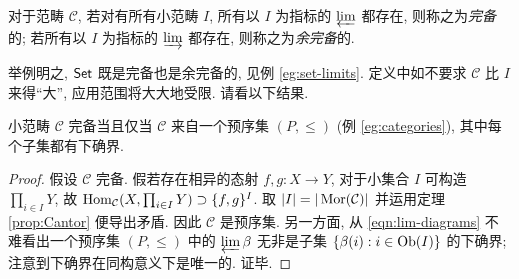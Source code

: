 \begin{definition}\label{def:completeness}
	对于范畴 $\mathcal{C}$, 若对有所有小范畴 $I$, 所有以 $I$ 为指标的 $\varprojlim$ 都存在, 则称之为\emph{完备}的; 若所有以 $I$ 为指标的 $\varinjlim$ 都存在, 则称之为\emph{余完备}的.
\end{definition}
举例明之, $\mathsf{Set}$ 既是完备也是余完备的, 见例 \ref{eg:set-limits}. 定义中如不要求 $\mathcal{C}$ 比 $I$ 来得``大'', 应用范围将大大地受限. 请看以下结果.
\begin{proposition}[P.\ Freyd]\label{prop:preorder-complete}
	小范畴 $\mathcal{C}$ 完备当且仅当 $\mathcal{C}$ 来自一个预序集 $(P, \leq)$ (例 \ref{eg:categories}), 其中每个子集都有下确界.
\end{proposition}
\begin{proof}
	假设 $\mathcal{C}$ 完备. 假若存在相异的态射 $f, g: X \to Y$, 对于小集合 $I$ 可构造 $\prod_{i \in I} Y$, 故 $\operatorname{Hom}_{\mathcal{C}}(X, \prod_{i \in I} Y) \supset \{f, g\}^I$. 取 $|I| = |\operatorname{Mor}(\mathcal{C})|$ 并运用定理 \ref{prop:Cantor} 便导出矛盾. 因此 $\mathcal{C}$ 是预序集. 另一方面, 从 \eqref{eqn:lim-diagrams} 不难看出一个预序集 $(P, \leq)$ 中的 $\varprojlim \beta$ 无非是子集 $\{\beta(i) : i \in \operatorname{Ob}(I) \}$ 的下确界; 注意到下确界在同构意义下是唯一的. 证毕.
\end{proof}

